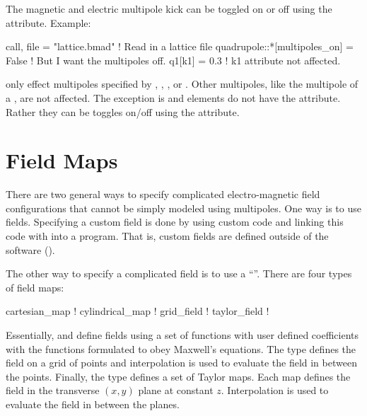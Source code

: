 The magnetic and electric multipole kick can be toggled on or off using the
 attribute. Example:
\begin{example}
  call, file = "lattice.bmad"             ! Read in a lattice file
  quadrupole::*[multipoles_on] = False    ! But I want the multipoles off.
  q1[k1] = 0.3                            ! k1 attribute not affected.
\end{example}
 only effect multipoles specified by , , , or
. Other multipoles, like the  multipole of a , are not
affected. The exception is  and  elements do not have the
 attribute. Rather they can be toggles on/off using the 
attribute.

\section{Field Maps}
\label{s:fieldmap}

There are two general ways to specify complicated electro-magnetic field configurations
that cannot be simply modeled using multipoles. One way is to use 
fields. Specifying a custom field is done by using custom code and linking this code with
\bmad into a program. That is, custom fields are defined outside of the \bmad software
().

The other way to specify a complicated field is to use a ``''. There
are four types of field maps:
\begin{example}
  cartesian_map       ! 
  cylindrical_map     ! 
  grid_field          ! 
  taylor_field        ! 
\end{example}
Essentially,  and  define fields using a set of
functions with user defined coefficients with the functions formulated to obey Maxwell's
equations. The  type defines the field on a grid of points and
interpolation is used to evaluate the field in between the points. Finally, the
 type defines a set of Taylor maps. Each map defines the field in the
transverse $(x, y)$ plane at constant $z$. Interpolation is used to evaluate the field
in between the planes.

